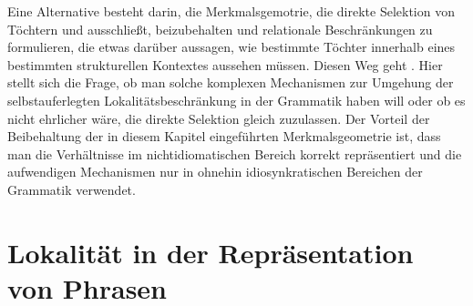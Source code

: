 Eine Alternative besteht darin, die Merkmalsgemotrie, die direkte Selektion von Töchtern und \phon
ausschließt, beizubehalten und relationale Beschränkungen zu formulieren, die etwas darüber
aussagen, wie bestimmte Töchter innerhalb eines bestimmten strukturellen Kontextes aussehen
müssen. Diesen Weg geht \zb \citet{Sailer2000a}. Hier stellt sich die Frage, ob man solche
komplexen Mechanismen zur Umgehung der selbstauferlegten Lokalitätsbeschränkung
in der Grammatik haben will oder ob es nicht ehrlicher wäre, die direkte Selektion gleich zuzulassen.
Der Vorteil der Beibehaltung der in diesem Kapitel eingeführten Merkmalsgeometrie ist, dass
man die Verhältnisse im nichtidiomatischen Bereich korrekt repräsentiert und die aufwendigen
Mechanismen nur in ohnehin idiosynkratischen Bereichen der Grammatik verwendet.%


\section{Lokalität in der Repräsentation von Phrasen}

